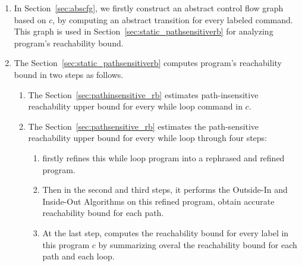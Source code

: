 \begin{enumerate}
\item  In Section~\ref{sec:abscfg}, we firstly construct an abstract control flow graph based on $c$, by computing an abstract transition 
for every labeled command. 
This graph is used in Section~\ref{sec:static_pathsensitiverb} for analyzing program's reachability bound.
\item The Section~\ref{sec:static_pathsensitiverb} computes program's reachability bound in two steps as follows.
\begin{enumerate}
\item The Section~\ref{sec:pathinsensitive_rb} estimates path-insensitive reachability upper bound for every while loop command in $c$.
\item The Section~\ref{sec:pathsensitive_rb} estimates the path-sensitive reachability upper bound 
for every while loop through four steps:
\begin{enumerate}
  \item {\THESYSTEM} firstly refines this while loop program into a rephrased and refined program.
\item Then in the second and third steps, it performs the Outside-In and Inside-Out Algorithms on this refined program, obtain 
accurate reachability bound for each path.
\item At the last step, {\THESYSTEM} computes the reachability bound for every label in this program $c$ by summarizing overal the reachability bound for
each path and each loop.
\end{enumerate}
\end{enumerate}
\end{enumerate}

